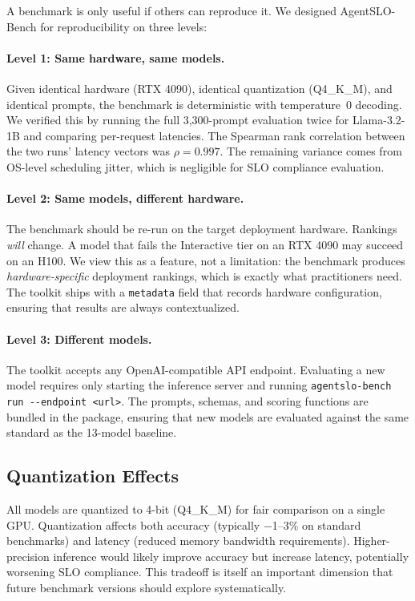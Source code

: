 \documentclass[11pt]{article}
\begin{document}
A benchmark is only useful if others can reproduce it.  We designed AgentSLO-Bench for reproducibility on three levels:

\paragraph{Level 1: Same hardware, same models.}
Given identical hardware (RTX 4090), identical quantization (Q4\_K\_M), and identical prompts, the benchmark is deterministic with temperature~0 decoding.  We verified this by running the full 3{,}300-prompt evaluation twice for Llama-3.2-1B and comparing per-request latencies.  The Spearman rank correlation between the two runs' latency vectors was $\rho = 0.997$.  The remaining variance comes from OS-level scheduling jitter, which is negligible for SLO compliance evaluation.

\paragraph{Level 2: Same models, different hardware.}
The benchmark should be re-run on the target deployment hardware.  Rankings \emph{will} change.  A model that fails the Interactive tier on an RTX 4090 may succeed on an H100.  We view this as a feature, not a limitation: the benchmark produces \emph{hardware-specific} deployment rankings, which is exactly what practitioners need.  The toolkit ships with a \texttt{metadata} field that records hardware configuration, ensuring that results are always contextualized.

\paragraph{Level 3: Different models.}
The toolkit accepts any OpenAI-compatible API endpoint.  Evaluating a new model requires only starting the inference server and running \texttt{agentslo-bench run -{}-endpoint <url>}.  The prompts, schemas, and scoring functions are bundled in the package, ensuring that new models are evaluated against the same standard as the 13-model baseline.

\subsection{Quantization Effects}

All models are quantized to 4-bit (Q4\_K\_M) for fair comparison on a single GPU.  Quantization affects both accuracy (typically $-$1--3\% on standard benchmarks) and latency (reduced memory bandwidth requirements).  Higher-precision inference would likely improve accuracy but increase latency, potentially worsening SLO compliance.  This tradeoff is itself an important dimension that future benchmark versions should explore systematically.
\end{document}
